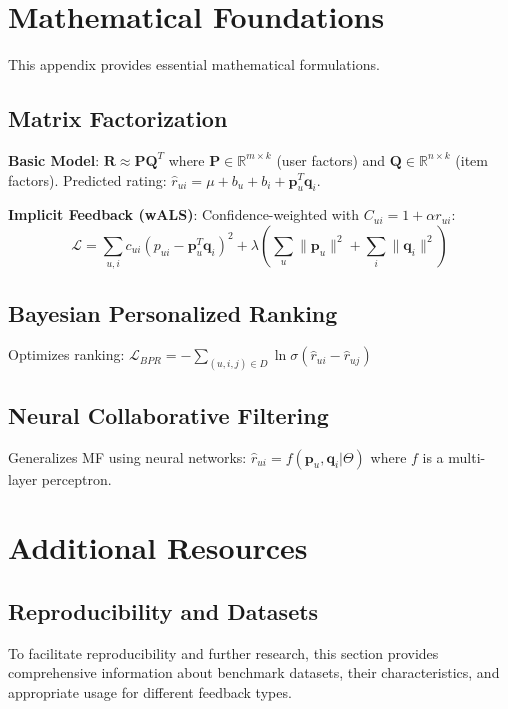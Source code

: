 
\appendix

\section{Mathematical Foundations}
\label{appendix:math}

This appendix provides essential mathematical formulations.

\subsection{Matrix Factorization}

\textbf{Basic Model}: $\mathbf{R} \approx \mathbf{P} \mathbf{Q}^T$ where $\mathbf{P} \in \mathbb{R}^{m \times k}$ (user factors) and $\mathbf{Q} \in \mathbb{R}^{n \times k}$ (item factors). Predicted rating: $\hat{r}_{ui} = \mu + b_u + b_i + \mathbf{p}_u^T \mathbf{q}_i$.

\textbf{Implicit Feedback (wALS)}: Confidence-weighted with $C_{ui} = 1 + \alpha r_{ui}$:
$$\mathcal{L} = \sum_{u,i} c_{ui} (p_{ui} - \mathbf{p}_u^T \mathbf{q}_i)^2 + \lambda \left( \sum_u \|\mathbf{p}_u\|^2 + \sum_i \|\mathbf{q}_i\|^2 \right)$$

\subsection{Bayesian Personalized Ranking}

Optimizes ranking: $\mathcal{L}_{BPR} = -\sum_{(u,i,j) \in D} \ln \sigma(\hat{r}_{ui} - \hat{r}_{uj})$

\subsection{Neural Collaborative Filtering}

Generalizes MF using neural networks: $\hat{r}_{ui} = f(\mathbf{p}_u, \mathbf{q}_i | \Theta)$ where $f$ is a multi-layer perceptron.

\section{Additional Resources}
\label{appendix:resources}

\subsection{Reproducibility and Datasets}

To facilitate reproducibility and further research, this section provides comprehensive information about benchmark datasets, their characteristics, and appropriate usage for different feedback types.

